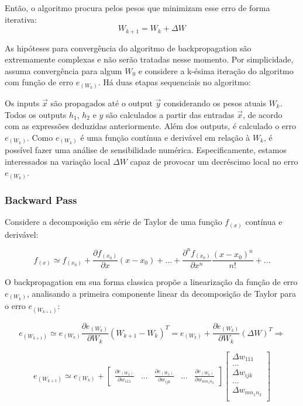 \documentclass[
	12pt,				%
	oneside,			%
	a4paper,			%
	english,			%
	french,				%
	spanish,			%
	brazil,				%
	]{abntex2}
\begin{document}
Ent\~ao, o algoritmo procura pelos pesos que minimizam esse erro de forma iterativa:
$$W_{k+1} = W_k + \Delta W$$

As hip\'oteses para converg\^encia do algoritmo de backpropagation s\~ao extremamente complexas e n\~ao ser\~ao tratadas nesse momento. Por simplicidade, assuma converg\^encia para algum $W_0$ e considere a k-\'esima itera\c{c}\~ao do algoritmo com fun\c{c}\~ao de erro $e_{(W_k)}$. H\'a duas etapas sequenciais no algoritmo:

Os inputs $\vec{x}$ s\~ao propagados at\'e o output $\vec{y}$ considerando os pesos atuais $W_k$. Todos os outputs $h_1$, $h_2$ e $y$ s\~ao calculados a partir das entradas $\vec{x}$, de acordo com as express\~oes deduzidas anteriormente. Al\'em dos outputs, \'e calculado o erro $e_{(W_k)}$.  Como $e_{(W_k)}$ \'e uma fun\c{c}\~ao cont\'inua e deriv\'avel em rela\c{c}\~ao \`a $W_k$, \'e poss\'ivel fazer uma an\'alise de sensibilidade num\'erica. Especificamente, estamos interessados na varia\c{c}\~ao local $\Delta W$ capaz de provocar um decr\'escimo local no erro $e_{(W_k)}$.

\subsubsection{Backward Pass}

Considere a decomposi\c{c}\~ao em s\'erie de Taylor de uma fun\c{c}\~ao $f_{(x)}$ cont\'inua e deriv\'avel:

$$f_{(x)} \simeq f_{(x_0)} + \frac{ \partial f_{(x_0)} } {\partial x} (x - x_0) + ... +
\frac{ \partial^n f_{(x_0)} } {\partial x^n} \frac{ (x - x_0)^n } { n! } + ...$$

O backpropagation em sua forma classica prop\~oe a lineariza\c{c}\~ao da fun\c{c}\~ao de erro $e_{(W_k)}$, analisando a primeira componente linear da decomposi\c{c}\~ao de Taylor para o erro $e_{(W_{k+1})}$:

$$e_{(W_{k+1})} \simeq e_{(W_{k})}  \frac{ \partial e_{(W_{k})} } { \partial W_k } (W_{k+1} - W_k)^T
= e_{(W_{k})} + \frac{ \partial e_{(W_{k})} } { \partial W_k }(\Delta W)^T \Rightarrow$$

$$e_{(W_{k+1})} \simeq e_{(W_{k})} + \begin{bmatrix}
\frac{ \partial e_{(W_{k})} } { \partial w_{111} } & ...
& \frac{ \partial e_{(W_{k})} } { \partial w_{ijk} } & ... & \frac{ \partial e_{(W_{k})} } { \partial w_{mn_1n_2} }

\end{bmatrix} \begin{bmatrix}
\Delta w_{111} \\
... \\
\Delta w_{ijk} \\
... \\
\Delta w_{mn_1n_2} \\

\end{bmatrix} $$
\end{document}
